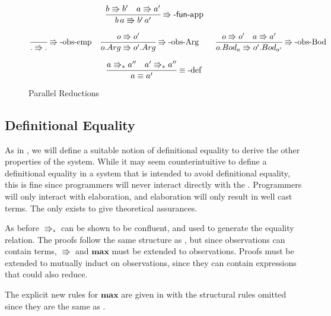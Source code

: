\begin{figure}
\[
\frac{b\Rrightarrow b'\quad a\Rrightarrow a'}{b\,a\Rrightarrow b'\,a'}
\operatorname{\Rrightarrow-\mathsf{fun}-app}
\]
 
\begin{align*}
  \frac{\,}{.\Rrightarrow.}
\operatorname{\Rrightarrow-obs-emp} &  \quad  \frac{o\Rrightarrow o'}{o.Arg\Rrightarrow o'.Arg}
\operatorname{\Rrightarrow-obs-Arg} \quad  &  \frac{o\Rrightarrow o'\quad a\Rrightarrow a'}{o.Bod_a \Rrightarrow o'.Bod_{a'}}
\operatorname{\Rrightarrow-obs-Bod}  \\
\end{align*}


\[
\frac{a\Rrightarrow_{\ast}a''\quad a'\Rrightarrow_{\ast}a''}{a\equiv a'}
\operatorname{\equiv-def}
\]
\caption{\CLang{} Parallel Reductions}
\label{fig:cast-reduction}
\end{figure}
 
\subsection{Definitional Equality}
 
As in , we will define a suitable notion of definitional equality to derive the other properties of the system.
While it may seem counterintuitive to define a definitional equality in a system that is intended to avoid definitional equality, this is fine since programmers will never interact directly with the \csys.
Programmers will only interact with elaboration, and elaboration will only result in well cast terms.
The \csys{} only exists to give theoretical assurances.
 
As before $\Rrightarrow_{*}$ can be shown to be confluent, and used to generate the equality relation.
The proofs follow the same structure as , but since observations can contain terms, $\Rrightarrow$ and $\textbf{max}$ must be extended to observations.
Proofs must be extended to mutually induct on observations, since they can contain expressions that could also reduce.
 
The explicit new rules for $\textbf{max}$ are given in  with the structural rules omitted since they are the same as .
 
